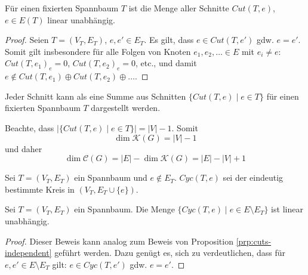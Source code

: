 \begin{proposition}
    \label{prp:cuts-independent}
    Für einen fixierten Spannbaum $ T $ ist die Menge aller Schnitte $ Cut(T, e) $, $ e \in E(T) $ linear unabhängig.
\end{proposition}

\begin{proof}
    Seien $ T = (V_T, E_T) $, $ e, e' \in E_T $.
    Es gilt, dass $ e \in Cut(T, e') $ gdw. $ e = e' $.
    Somit gilt insbesondere für alle Folgen von Knoten $ e_1, e_2, \dots \in E $ mit $ e_i \ne e $: $ Cut(T, e_1)_e = 0 $, $ Cut(T, e_2)_e = 0 $, etc., und damit $ e \notin Cut(T, e_1) \oplus Cut(T, e_2) \oplus \dots $.
\end{proof}

\begin{proposition}
    Jeder Schnitt kann als eine Summe aus Schnitten $ \{ Cut(T, e) \mid e \in T \} $ für einen fixierten Spannbaum $ T $ dargestellt werden.
\end{proposition}

\begin{proposition}
    \label{prp:dim-bases}
    Beachte, dass $ |\{ Cut(T, e) \mid e \in T \}| = |V| - 1 $.
    Somit
    \begin{equation*}
        \dim \mathcal{K}(G) = |V| - 1
    \end{equation*}
    und daher
    \begin{equation*}
        \dim \mathcal{C}(G) = |E| - \dim \mathcal{K}(G) = |E| - |V| + 1
    \end{equation*}
\end{proposition}

\begin{definition}[Cyc]
    Sei $ T = (V_T, E_T) $ ein Spannbaum und $ e \notin E_T $.
    $ Cyc(T, e) $ sei der eindeutig bestimmte Kreis in $ (V_T, E_T \cup \{ e \}) $.
\end{definition}

\begin{proposition}
    \label{prp:cyc-independent}
    Sei $ T = (V_T, E_T) $ ein Spannbaum.
    Die Menge $ \{ Cyc(T, e) \mid e \in E \setminus E_T \} $ ist linear unabhängig.
\end{proposition}

\begin{proof}
    Dieser Beweis kann analog zum Beweis von Proposition \ref{prp:cuts-independent} geführt werden.
    Dazu genügt es, sich zu verdeutlichen, dass für $ e, e' \in E \setminus E_T $ gilt: $ e \in Cyc(T, e') $ gdw. $ e = e' $.
\end{proof}

